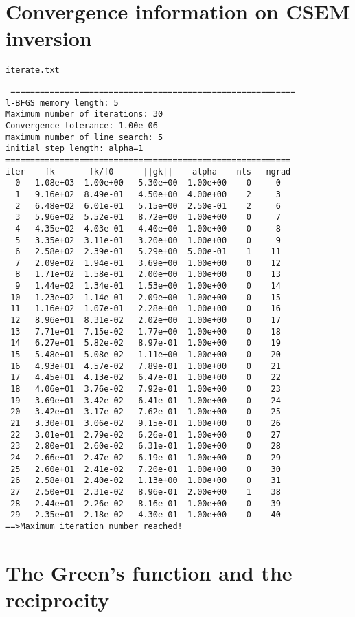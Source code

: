 \documentclass[a4paper,10pt]{article}
\begin{document}
\section{Convergence information on CSEM inversion}

\verb|iterate.txt|
\begin{verbatim}
 ==========================================================
l-BFGS memory length: 5
Maximum number of iterations: 30
Convergence tolerance: 1.00e-06
maximum number of line search: 5
initial step length: alpha=1
==========================================================
iter    fk       fk/f0      ||gk||    alpha    nls   ngrad
  0   1.08e+03  1.00e+00   5.30e+00  1.00e+00    0     0
  1   9.16e+02  8.49e-01   4.50e+00  4.00e+00    2     3
  2   6.48e+02  6.01e-01   5.15e+00  2.50e-01    2     6
  3   5.96e+02  5.52e-01   8.72e+00  1.00e+00    0     7
  4   4.35e+02  4.03e-01   4.40e+00  1.00e+00    0     8
  5   3.35e+02  3.11e-01   3.20e+00  1.00e+00    0     9
  6   2.58e+02  2.39e-01   5.29e+00  5.00e-01    1    11
  7   2.09e+02  1.94e-01   3.69e+00  1.00e+00    0    12
  8   1.71e+02  1.58e-01   2.00e+00  1.00e+00    0    13
  9   1.44e+02  1.34e-01   1.53e+00  1.00e+00    0    14
 10   1.23e+02  1.14e-01   2.09e+00  1.00e+00    0    15
 11   1.16e+02  1.07e-01   2.28e+00  1.00e+00    0    16
 12   8.96e+01  8.31e-02   2.02e+00  1.00e+00    0    17
 13   7.71e+01  7.15e-02   1.77e+00  1.00e+00    0    18
 14   6.27e+01  5.82e-02   8.97e-01  1.00e+00    0    19
 15   5.48e+01  5.08e-02   1.11e+00  1.00e+00    0    20
 16   4.93e+01  4.57e-02   7.89e-01  1.00e+00    0    21
 17   4.45e+01  4.13e-02   6.47e-01  1.00e+00    0    22
 18   4.06e+01  3.76e-02   7.92e-01  1.00e+00    0    23
 19   3.69e+01  3.42e-02   6.41e-01  1.00e+00    0    24
 20   3.42e+01  3.17e-02   7.62e-01  1.00e+00    0    25
 21   3.30e+01  3.06e-02   9.15e-01  1.00e+00    0    26
 22   3.01e+01  2.79e-02   6.26e-01  1.00e+00    0    27
 23   2.80e+01  2.60e-02   6.31e-01  1.00e+00    0    28
 24   2.66e+01  2.47e-02   6.19e-01  1.00e+00    0    29
 25   2.60e+01  2.41e-02   7.20e-01  1.00e+00    0    30
 26   2.58e+01  2.40e-02   1.13e+00  1.00e+00    0    31
 27   2.50e+01  2.31e-02   8.96e-01  2.00e+00    1    38
 28   2.44e+01  2.26e-02   8.16e-01  1.00e+00    0    39
 29   2.35e+01  2.18e-02   4.30e-01  1.00e+00    0    40
==>Maximum iteration number reached!
\end{verbatim}


\section{The Green's function and the reciprocity}\label{appendix:reciprocity}
\end{document}
